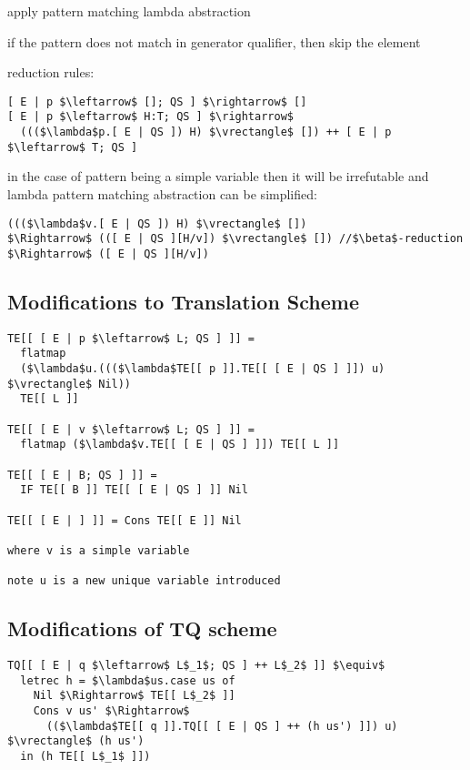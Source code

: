 \documentclass[8pt]{extarticle}
\newcommand*{\vrectangle}{{\setlength{\fboxsep}{0pt}\fbox{\phantom{l}}}}
\begin{document}
\begin{multicols*}{2}
apply pattern matching lambda abstraction

if the pattern does not match in generator qualifier, then skip the element

reduction rules:

\begin{lstlisting}
[ E | p $\leftarrow$ []; QS ] $\rightarrow$ []
[ E | p $\leftarrow$ H:T; QS ] $\rightarrow$
  ((($\lambda$p.[ E | QS ]) H) $\vrectangle$ []) ++ [ E | p $\leftarrow$ T; QS ]
\end{lstlisting}

in the case of pattern being a simple variable then it will be irrefutable and lambda pattern matching abstraction can be simplified:

\begin{lstlisting}
((($\lambda$v.[ E | QS ]) H) $\vrectangle$ [])
$\Rightarrow$ (([ E | QS ][H/v]) $\vrectangle$ []) //$\beta$-reduction
$\Rightarrow$ ([ E | QS ][H/v])
\end{lstlisting}

\subsection{Modifications to Translation Scheme}

\begin{lstlisting}
TE[[ [ E | p $\leftarrow$ L; QS ] ]] =
  flatmap
  ($\lambda$u.((($\lambda$TE[[ p ]].TE[[ [ E | QS ] ]]) u) $\vrectangle$ Nil))
  TE[[ L ]]

TE[[ [ E | v $\leftarrow$ L; QS ] ]] =
  flatmap ($\lambda$v.TE[[ [ E | QS ] ]]) TE[[ L ]]

TE[[ [ E | B; QS ] ]] =
  IF TE[[ B ]] TE[[ [ E | QS ] ]] Nil

TE[[ [ E | ] ]] = Cons TE[[ E ]] Nil

where v is a simple variable

note u is a new unique variable introduced
\end{lstlisting}

\subsection{Modifications of TQ scheme}

\begin{lstlisting}
TQ[[ [ E | q $\leftarrow$ L$_1$; QS ] ++ L$_2$ ]] $\equiv$
  letrec h = $\lambda$us.case us of
    Nil $\Rightarrow$ TE[[ L$_2$ ]]
    Cons v us' $\Rightarrow$
      (($\lambda$TE[[ q ]].TQ[[ [ E | QS ] ++ (h us') ]]) u) $\vrectangle$ (h us')
  in (h TE[[ L$_1$ ]])


\end{lstlisting}
\end{multicols*}
\end{document}
